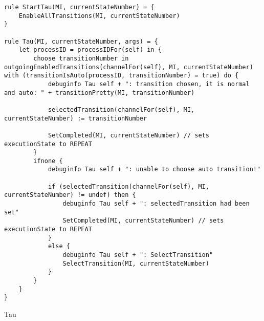 \begin{listing}[H]
\begin{verbatim}
rule StartTau(MI, currentStateNumber) = {
    EnableAllTransitions(MI, currentStateNumber)
}

rule Tau(MI, currentStateNumber, args) = {
    let processID = processIDFor(self) in {
        choose transitionNumber in outgoingEnabledTransitions(channelFor(self), MI, currentStateNumber) with (transitionIsAuto(processID, transitionNumber) = true) do {
            debuginfo Tau self + ": transition chosen, it is normal and auto: " + transitionPretty(MI, transitionNumber)

            selectedTransition(channelFor(self), MI, currentStateNumber) := transitionNumber

            SetCompleted(MI, currentStateNumber) // sets executionState to REPEAT
        }
        ifnone {
            debuginfo Tau self + ": unable to choose auto transition!"

            if (selectedTransition(channelFor(self), MI, currentStateNumber) != undef) then {
                debuginfo Tau self + ": selectedTransition had been set"
                SetCompleted(MI, currentStateNumber) // sets executionState to REPEAT
            }
            else {
                debuginfo Tau self + ": SelectTransition"
                SelectTransition(MI, currentStateNumber)
            }
        }
    }
}
\end{verbatim}
\caption{Tau}
\label{lst:asm:Tau}
\end{listing}




